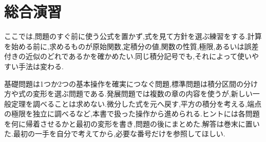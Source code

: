 \chapter{総合演習}\label{章:総合演習}

ここでは,問題のすぐ前に使う公式を置かず,式を見て方針を選ぶ練習をする.計算を始める前に,求めるものが原始関数,定積分の値,関数の性質,極限,あるいは誤差付きの近似のどれであるかを確かめたい.同じ積分記号でも,それによって使いやすい手法は変わる.

基礎問題は1つか2つの基本操作を確実につなぐ問題,標準問題は積分区間の分け方や式の変形を選ぶ問題である.発展問題では複数の章の内容を使うが,新しい一般定理を調べることは求めない.微分した式を元へ戻す,平方の積分を考える,端点の極限を独立に調べるなど,本書で扱った操作から進められる.ヒントには各問題を何に帰着させるかと最初の変形を書き,問題の後にまとめた.解答は巻末に置いた.最初の一手を自分で考えてから,必要な番号だけを参照してほしい.

%
%
%
%
\clearpage
%
